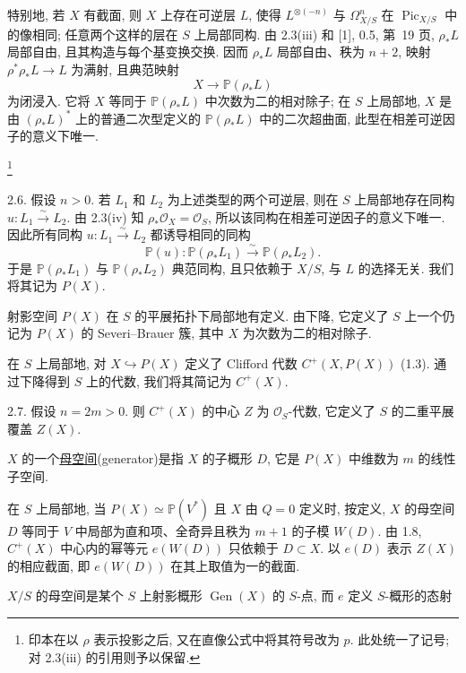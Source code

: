 特别地, 若 $X$ 有截面, 则 $X$ 上存在可逆层 $L$, 使得 $L^{\otimes(-n)}$ 与 $\Omega^n_{X/S}$ 在 $\operatorname{Pic}_{X/S}$ 中的像相同; 任意两个这样的层在 $S$ 上局部同构. 由 2.3(iii) 和 [1], 0.5, 第~19 页, $\rho_*L$ 局部自由, 且其构造与每个基变换交换. 因而 $\rho_*L$ 局部自由、秩为 $n+2$, 映射 $\rho^*\rho_*L\longrightarrow L$ 为满射, 且典范映射
\begin{equation*}
X\longrightarrow\mathbb P(\rho_*L)
\end{equation*}
为闭浸入. 它将 $X$ 等同于 $\mathbb P(\rho_*L)$ 中次数为二的相对除子; 在 $S$ 上局部地, $X$ 是由 $(\rho_*L)^*$ 上的普通二次型定义的 $\mathbb P(\rho_*L)$ 中的二次超曲面, 此型在相差可逆因子的意义下唯一.

\footnote{印本在以 $\rho$ 表示投影之后, 又在直像公式中将其符号改为 $p$. 此处统一了记号; 对 2.3(iii) 的引用则予以保留.}

2.6. 假设 $n>0$. 若 $L_1$ 和 $L_2$ 为上述类型的两个可逆层, 则在 $S$ 上局部地存在同构 $u:L_1\xrightarrow{\sim}L_2$. 由 2.3(iv) 知 $\rho_*\mathcal O_X=\mathcal O_S$, 所以该同构在相差可逆因子的意义下唯一. 因此所有同构 $u:L_1\xrightarrow{\sim}L_2$ 都诱导相同的同构
\begin{equation*}
\mathbb P(u):\mathbb P(\rho_*L_1)\xrightarrow{\sim}
\mathbb P(\rho_*L_2).
\end{equation*}
于是 $\mathbb P(\rho_*L_1)$ 与 $\mathbb P(\rho_*L_2)$ 典范同构, 且只依赖于 $X/S$, 与 $L$ 的选择无关. 我们将其记为 $P(X)$.


射影空间 $P(X)$ 在 $S$ 的平展拓扑下局部地有定义. 由下降, 它定义了 $S$ 上一个仍记为 $P(X)$ 的 Severi--Brauer 簇, 其中 $X$ 为次数为二的相对除子.

在 $S$ 上局部地, 对 $X\hookrightarrow P(X)$ 定义了 Clifford 代数 $C^+(X,P(X))$ (1.3). 通过下降得到 $S$ 上的代数, 我们将其简记为 $C^+(X)$.

2.7. 假设 $n=2m>0$. 则 $C^+(X)$ 的中心 $Z$ 为 $\mathcal O_S$-代数, 它定义了 $S$ 的二重平展覆盖 $Z(X)$.

$X$ 的一个\underline{母空间}(generator)是指 $X$ 的子概形 $D$, 它是 $P(X)$ 中维数为 $m$ 的线性子空间.

在 $S$ 上局部地, 当 $P(X)\simeq\mathbb P(V^*)$ 且 $X$ 由 $Q=0$ 定义时, 按定义, $X$ 的母空间 $D$ 等同于 $V$ 中局部为直和项、全奇异且秩为 $m+1$ 的子模 $W(D)$. 由 1.8, $C^+(X)$ 中心内的幂等元 $e(W(D))$ 只依赖于 $D\subset X$. 以 $e(D)$ 表示 $Z(X)$ 的相应截面, 即 $e(W(D))$ 在其上取值为一的截面.

$X/S$ 的母空间是某个 $S$ 上射影概形 $\operatorname{Gen}(X)$ 的 $S$-点, 而 $e$ 定义 $S$-概形的态射

